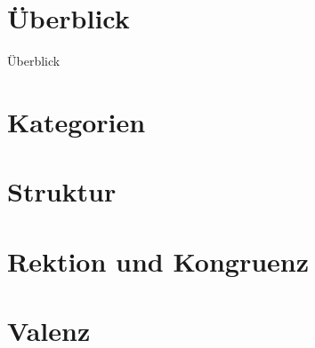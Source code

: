 \section{Überblick}

\begin{frame}
  {Überblick}
\end{frame}

\section{Kategorien}

\section{Struktur}

\section{Rektion und Kongruenz}

\section{Valenz}

